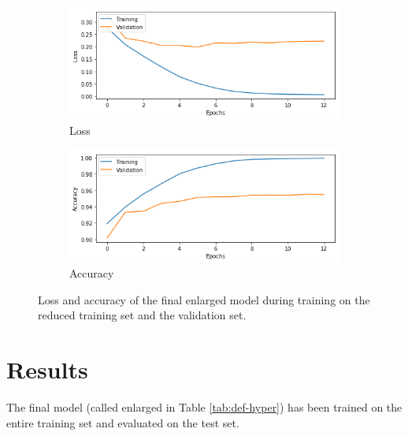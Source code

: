 \documentclass[12pt]{article}
\begin{document}
\begin{figure}[h]
	\centering
	\begin{subfigure}{0.49\textwidth}
		\includegraphics[width=\linewidth]{val_loss}
		\caption{Loss}
		\label{fig:hista}
	\end{subfigure}
	\hspace*{\fill} %
	\begin{subfigure}{0.49\textwidth}
		\includegraphics[width=\linewidth]{val_acc}
		\caption{Accuracy}
		\label{fig:histb}
	\end{subfigure}
	\caption{Loss and accuracy of the final enlarged model during training on the reduced training set and the validation set.}
	\label{fig:val_graphs}
\end{figure}



\section*{Results}

The final model (called enlarged in Table \ref{tab:def-hyper}) has been trained on the entire training set and evaluated on the test set.
\end{document}

